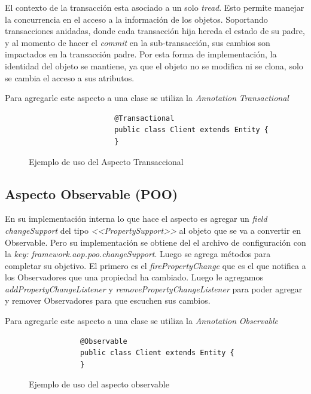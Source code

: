 		\medskip
		
		El contexto de la transacción esta asociado a un solo \emph{tread}. Esto
		permite manejar la concurrencia en el acceso a la información de los objetos. 
		Soportando transacciones anidadas, donde cada transacción hija hereda el estado
		de su padre, y al momento de hacer el \emph{commit} en la sub-transacción, sus
		cambios son impactados en la transacción padre.
		Por esta forma de implementación, la identidad del objeto se mantiene, ya que
		el objeto no se modifica ni se clona, solo se cambia el acceso a sus
		atributos.
		
		Para agregarle este aspecto a una clase se utiliza la \emph{Annotation}
		\emph{Transactional }
				
		\begin{figure}[h]
				\begin{lstlisting} 
					@Transactional
					public class Client extends Entity {
					}
				\end{lstlisting}
			\caption{Ejemplo de uso del Aspecto Transaccional}
			\label{pot}
		\end{figure}  

	\subsection{ Aspecto Observable (POO)}
			
		En su implementación interna lo que hace el aspecto es agregar un \emph{field
		changeSupport} del tipo \emph{<<PropertySupport>>} al objeto que se va a
		convertir en Observable. Pero su implementación se obtiene del el archivo de
		configuración con la \emph{key: framework.aop.poo.changeSupport}.
		Luego se agrega métodos para completar su objetivo.
		El primero es el \emph{firePropertyChange} que es el que notifica a los
		Observadores que una propiedad ha cambiado.	Luego le agregamos
		\emph{addPropertyChangeListener} y \emph{removePropertyChangeListener} para
		poder agregar y remover Observadores para que escuchen sus cambios.
		
		Para agregarle este aspecto a una clase se utiliza la \emph{Annotation}
		\emph{Observable}
		
	\begin{figure}[h]
		\begin{lstlisting} 
			@Observable
			public class Client extends Entity {
			}
		\end{lstlisting}
		\caption{Ejemplo de uso del aspecto observable}
		\label{poo}
	\end{figure}  
		


